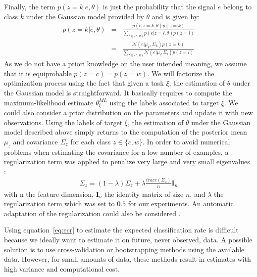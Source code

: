 Finally, the term $p(z=k|e,\theta)$ is just the probability that the signal $e$ belong to class $k$ under the Gaussian model provided by $\theta$ and is given by:
%
\begin{eqnarray}
    p(z=k|e,\theta) &=& 
                \frac{p(e|z=k, \theta)p(z = k)}{\sum_{l \in \{c,w\}}{p(e|z=l,\theta)p(z=l)}}\nonumber\\
                 &=& \frac{\mathcal{N}(e|\mu_k, \Sigma_k)p(z = k)}{\sum_{l \in \{c,w\}}{\mathcal{N}(e|\mu_l, \Sigma_l)p(z=l)}}
    \label{eq:dev}
\end{eqnarray}
%
As we do not have a priori knowledge on the user intended meaning, we assume that it is equiprobable $p(z = c) = p(z = w)$. We will factorize the optimization process using the fact that given a task $\xi$, the estimation of $\theta$ under the Gaussian model is straightforward. It basically requires to compute the maximum-likelihood estimate $\theta^{ML}_{\xi}$ using the labels associated to target $\xi$. We could also consider a prior distribution on the parameters and update it with new observations. Using the labels of target $\xi$, the estimation of $\theta$ under the Gaussian model described above simply returns to the computation of the posterior mean $\mu_z$ and covariance $\Sigma_z$ for each class $z \in \{c, w\}$. In order to avoid numerical problems when estimating the covariance for a low number of examples, a regularization term was applied to penalize very large and very small eigenvalues \cite{friedman1989regularized}:
%
\begin{eqnarray}
\Sigma_z = (1-\lambda)\Sigma_z + \lambda \frac{trace(\Sigma_z)}{n} \textbf{I}_n
\end{eqnarray}
%
with n the feature dimension, $\textbf{I}_n$ the identity matrix of size $n$, and $\lambda$ the regularization term which was set to $0.5$ for our experiments. An automatic adaptation of the regularization could also be considered \cite{ledoit2004well}.

Using equation~\ref{eq:ecr} to estimate the expected classification rate is difficult because we ideally want to estimate it on future, never observed, data. A possible solution is to use cross-validation or bootstrapping methods using the available data. However, for small amounts of data, these methods result in estimates with high variance \cite{bengio2004no} and computational cost.

